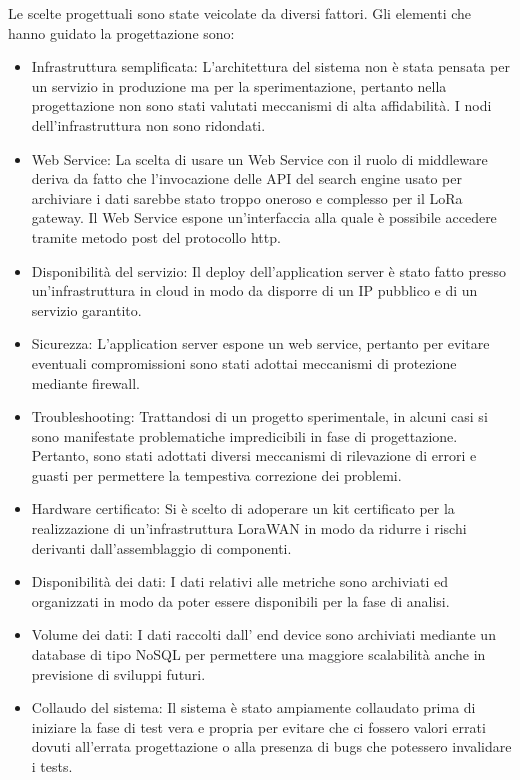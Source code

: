 \documentclass[12pt,a4paper,openright,twoside]{report}
\begin{document}
Le scelte progettuali sono state veicolate da diversi fattori. Gli elementi che hanno guidato la progettazione sono:
\begin{itemize}                       
\item Infrastruttura semplificata: L'architettura del sistema non \`e stata pensata per un servizio in produzione ma per la sperimentazione, pertanto nella progettazione non sono stati valutati meccanismi di alta affidabilit\`a. I nodi dell'infrastruttura non sono ridondati. 
\item Web Service: La scelta di usare un Web Service con il ruolo di middleware deriva da fatto che l'invocazione delle API del search engine usato per archiviare i dati sarebbe stato troppo oneroso e complesso per il LoRa gateway. Il Web Service espone un'interfaccia alla quale  \`e possibile accedere tramite metodo post del protocollo http. 
\item Disponibilit\`a del servizio: Il deploy dell'application server \`e stato fatto presso un'infrastruttura in cloud in modo da disporre di un IP pubblico e di un servizio garantito. 
\item Sicurezza: L'application server espone un web service, pertanto per evitare eventuali compromissioni sono stati adottai meccanismi di protezione mediante firewall.
\item Troubleshooting: Trattandosi di un progetto sperimentale, in alcuni casi si sono manifestate problematiche impredicibili in fase di progettazione. Pertanto, sono stati adottati diversi meccanismi di rilevazione di errori e guasti per permettere la tempestiva correzione dei problemi.
\item Hardware certificato: Si \`e scelto di adoperare un kit certificato per la realizzazione di un'infrastruttura LoraWAN in modo da ridurre i rischi derivanti dall'assemblaggio di componenti. 
\item Disponibilit\`a dei dati: I dati relativi alle metriche sono archiviati ed organizzati in modo da poter essere disponibili per la fase di analisi.
\item Volume dei dati: I dati raccolti dall' end device sono archiviati mediante un database di tipo NoSQL per permettere una maggiore scalabilit\`a anche in previsione di sviluppi futuri.
\item Collaudo del sistema: Il sistema \`e stato ampiamente collaudato prima di iniziare la fase di test vera e propria per evitare che ci fossero valori errati dovuti all'errata progettazione o alla presenza di bugs che potessero invalidare i tests.

\end{itemize}
\end{document}
